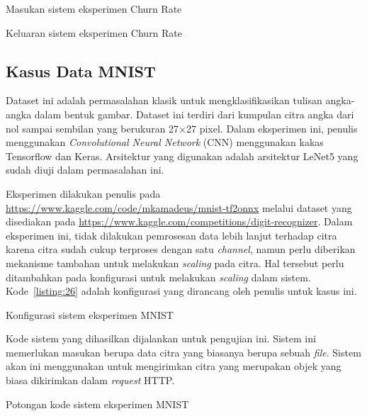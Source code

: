 \begin{code}
	\caption{Masukan sistem eksperimen Churn Rate}\label{listing:24}
\end{code}

\begin{code}
	\caption{Keluaran sistem eksperimen Churn Rate}\label{listing:25}
\end{code}

\subsection{Kasus Data MNIST}

Dataset ini adalah permasalahan klasik untuk mengklasifikasikan tulisan angka-angka dalam bentuk gambar.
Dataset ini terdiri dari kumpulan citra angka dari nol sampai sembilan yang berukuran 27\(\times\)27 pixel.
Dalam eksperimen ini, penulis menggunakan \textit{Convolutional Neural Network} (CNN) menggunakan kakas Tensorflow dan Keras.
Arsitektur yang digunakan adalah arsitektur LeNet5 yang sudah diuji dalam permasalahan ini.

Eksperimen dilakukan penulis pada \url{https://www.kaggle.com/code/mkamadeus/mnist-tf2onnx} melalui dataset yang disediakan pada \url{https://www.kaggle.com/competitions/digit-recognizer}.
Dalam eksperimen ini, tidak dilakukan pemrosesan data lebih lanjut terhadap citra karena citra sudah cukup terproses dengan satu \textit{channel}, namun perlu diberikan mekanisme tambahan untuk melakukan \textit{scaling} pada citra.
Hal tersebut perlu ditambahkan pada konfigurasi untuk melakukan \textit{scaling} dalam sistem.
Kode~\ref{listing:26} adalah konfigurasi yang dirancang oleh penulis untuk kasus ini.

\begin{code}
	\caption{Konfigurasi sistem eksperimen MNIST}\label{listing:26}
\end{code}

Kode sistem yang dihasilkan dijalankan untuk pengujian ini.
Sistem ini memerlukan masukan berupa data citra yang biasanya berupa sebuah \textit{file}.
Sistem akan ini menggunakan  untuk mengirimkan citra yang merupakan objek yang biasa dikirimkan dalam \textit{request} HTTP.\@

\begin{code}
	\caption{Potongan kode sistem eksperimen MNIST}\label{listing:27}
\end{code}

